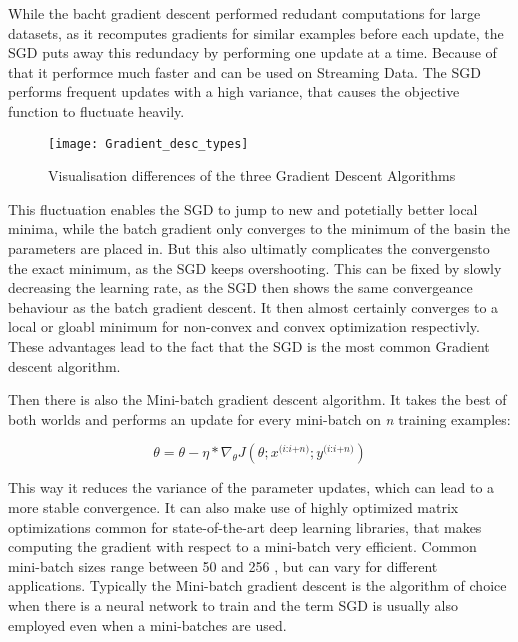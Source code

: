 \documentclass[12pt,oneside,a4paper,parskip]{scrbook}
\begin{document}
While the bacht gradient descent performed redudant computations for large datasets, as it recomputes gradients for similar examples 
before each update, the SGD puts away this redundacy by performing one update at a time. Because of that it performce much faster and 
can be used on Streaming Data.
The SGD performs frequent updates with a high variance, that causes the objective function to fluctuate heavily. 

\begin{figure}
  \centering
  \texttt{[image: Gradient\_desc\_types]}
  \caption{Visualisation differences of the three Gradient Descent Algorithms}
  \label{fig:comp_GD}
\end{figure}

This fluctuation enables the SGD to jump to new and potetially better local minima, while the batch gradient only converges 
to the minimum of the basin the parameters are placed in. But this also ultimatly complicates the convergensto the exact minimum, 
as the SGD keeps overshooting. This can be fixed by slowly decreasing the learning rate, as the SGD then shows the same 
convergeance behaviour as the batch gradient descent. It then almost certainly converges to a local or gloabl minimum for
non-convex and convex optimization respectivly. \cite{overvieDiffRSLVQ}
These advantages lead to the fact that the SGD is the most common Gradient descent algorithm.

Then there is also the Mini-batch gradient descent algorithm. It takes the best of both worlds and performs an update for
every mini-batch on \textit{n} training examples:

\begin{equation}
\theta = \theta - \eta * \nabla_\theta \textit{J}(\theta;\textit{x}^\textit{(i:i+n)};\textit{y}^\textit{(i:i+n)})
\end{equation}

This way it reduces the variance of the parameter updates, which can lead to a more stable convergence.
It can also make use of highly optimized matrix optimizations common for state-of-the-art deep learning libraries,
that makes computing the gradient with respect to a mini-batch very efficient. 
Common mini-batch sizes range between 50 and 256 , but can vary for different applications. Typically the Mini-batch gradient descent is the 
algorithm of choice when there is a neural network to train and the term SGD is usually also employed even when a mini-batches
are used. \cite{overvieDiffRSLVQ}
\end{document}

